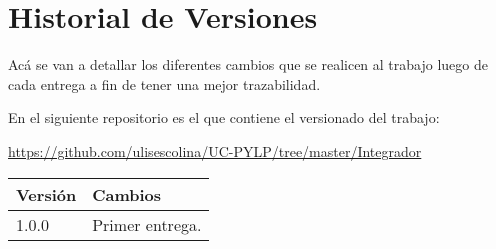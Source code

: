 \section*{Historial de Versiones}
Acá se van a detallar los diferentes cambios que se realicen al trabajo luego
de cada entrega a fin de tener una mejor trazabilidad.

En el siguiente repositorio es el que contiene el versionado del trabajo:
\begin{center}
\url{https://github.com/ulisescolina/UC-PYLP/tree/master/Integrador}
\end{center}

\begin{center}
  \begin{tabular}{||p{2cm} p{10cm}||} 
    \hline
    Versión & Cambios \\ [0.5ex] 
    \hline\hline
    1.0.0 & Primer entrega. \\ [0.5ex]
    \hline
  \end{tabular}
\end{center}
\newpage

